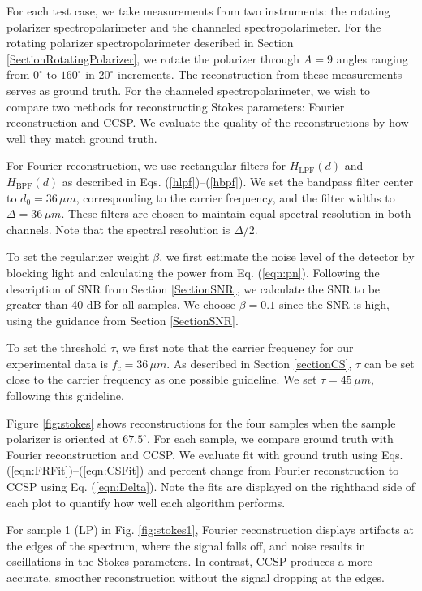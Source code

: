 \documentclass[10pt]{article}
\numberwithin{equation}{subsection}
\begin{document}
    For each test case, we take measurements from two instruments: the rotating polarizer spectropolarimeter and the channeled spectropolarimeter.
    For the rotating polarizer spectropolarimeter described in Section \ref{SectionRotatingPolarizer}, we rotate the polarizer through $A = 9$ angles ranging from $0^\circ$ to $160^\circ$ in $20^\circ$ increments.
    The reconstruction from these measurements serves as ground truth.
    For the channeled spectropolarimeter, we wish to compare two methods for reconstructing Stokes parameters: Fourier reconstruction and CCSP.
    We evaluate the quality of the reconstructions by how well they match ground truth.

    For Fourier reconstruction, we use rectangular filters for $H_\text{LPF}(d)$ and $H_\text{BPF}(d)$ as described in Eqs. (\ref{hlpf})--(\ref{hbpf}).
    We set the bandpass filter center to $d_0 = 36 \, \mu m$, corresponding to the carrier frequency, and the filter widths to $\Delta = 36 \, \mu m$.
    These filters are chosen to maintain equal spectral resolution in both channels.
    Note that the spectral resolution is $\Delta / 2$.

    To set the regularizer weight $\beta$, we first estimate the noise level of the detector by blocking light and calculating the power from Eq. (\ref{eqn:pn}).
    Following the description of SNR from Section \ref{SectionSNR}, we calculate the SNR to be greater than 40 dB for all samples.
    We choose $\beta=0.1$ since the SNR is high, using the guidance from Section \ref{SectionSNR}.

    To set the threshold $\tau$, we first note that the carrier frequency for our experimental data is $f_c = 36\, \mu m$.
    As described in Section \ref{sectionCS}, $\tau$ can be set close to the carrier frequency as one possible guideline.
    We set $\tau = 45 \, \mu m$, following this guideline.

    Figure \ref{fig:stokes} shows reconstructions for the four samples when the sample polarizer is oriented at $67.5^\circ$.
    For each sample, we compare ground truth with Fourier reconstruction and CCSP.
    We evaluate fit with ground truth using Eqs. (\ref{eqn:FRFit})--(\ref{eqn:CSFit}) and percent change from Fourier reconstruction to CCSP using Eq. (\ref{eqn:Delta}).
    Note the fits are displayed on the righthand side of each plot to quantify how well each algorithm performs.

    For sample 1 (LP) in Fig. \ref{fig:stokes1}, Fourier reconstruction displays artifacts at the edges of the spectrum, where the signal falls off, and noise results in oscillations in the Stokes parameters.
    In contrast, CCSP produces a more accurate, smoother reconstruction without the signal dropping at the edges.
\end{document}
